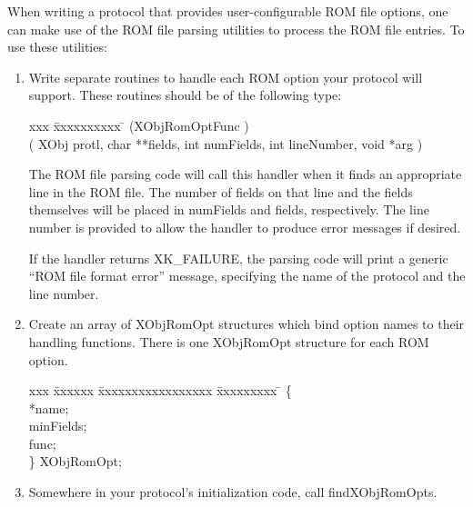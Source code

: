 When writing a protocol that provides user-configurable ROM file
options, one can make use of the ROM file parsing utilities to process
the ROM file entries.  To use these utilities:

\begin{enumerate}

\item{}
Write separate routines to handle each ROM option your
protocol will support.  These routines should be of the following
type: 

\begin{tabbing}
xxx \= xxxxxxxxxx \=   \kill
{} ({\bold *XObjRomOptFunc} ) \\
\>\>(
{\sem XObj} {\caps protl}, 
{\sem char} **{\caps fields}, 
{\sem int} {\caps numFields}, 
{\sem int} {\caps lineNumber}, 
{\sem void} *{\caps arg} 
)
\end{tabbing}

The ROM file parsing code will call this handler when it finds an
appropriate line in the ROM file.  The number of fields on that line
and the fields themselves will be placed in {\caps numFields} and
{\caps fields}, respectively.  The line number is
provided to allow the handler to produce error messages if desired.

If the handler returns XK\_FAILURE, the parsing code will print a
generic ``ROM file format error'' message, specifying the name of the
protocol and the line number.  


\item{}
Create an array of XObjRomOpt structures which bind 
option names to their handling functions.  There is one XObjRomOpt
structure for each ROM option.

\begin{tabbing}
xxx \= xxxxxx \= xxxxxxxxxxxxxxxxx \= xxxxxxxxx \=  \kill
{} \{\\
\> \>*name; 
        \\
\>	 \>minFields;  
        \\
\>	\>func;       
        \\
\>\} {\bold XObjRomOpt};

\end{tabbing}


\item{}
Somewhere in your protocol's initialization code, call findXObjRomOpts.


\end{enumerate}
